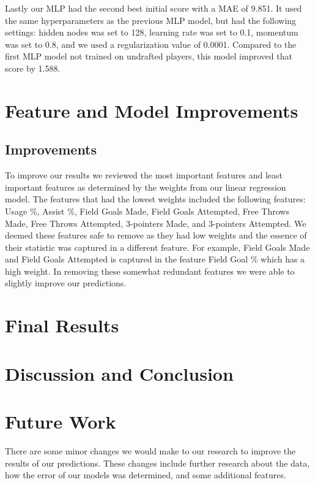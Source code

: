 \documentclass{article}
\begin{document}
Lastly our MLP had the second best initial score with a MAE of 9.851. It used the same hyperparameters as the previous MLP model, 
but had the following settings: hidden nodes was set to 128, learning rate was set to 0.1, momentum was set to 0.8, and we used a 
regularization value of 0.0001. Compared to the first MLP model not trained on undrafted players, this model improved that score by 1.588.

\section{Feature and Model Improvements}

\subsection{Improvements}

To improve our results we reviewed the most important features and least
important features as determined by the weights from our linear regression
model. The features that had the lowest weights included the following features:
Usage \%, Assist \%, Field Goals Made, Field Goals Attempted, Free Throws Made,
Free Throws Attempted, 3-pointers Made, and 3-pointers Attempted. We deemed
these features safe to remove as they had low weights and the essence of their
statistic was captured in a different feature. For example, Field Goals Made and
Field Goals Attempted is captured in the feature Field Goal \% which has a high
weight. In removing these somewhat redundant features we were able to slightly
improve our predictions. 


\section{Final Results}

\section{Discussion and Conclusion}

\section{Future Work}

There are some minor changes we would make to our research to improve the
results of our predictions. These changes include further research about the
data, how the error of our models was determined, and some additional features.
\end{document}
